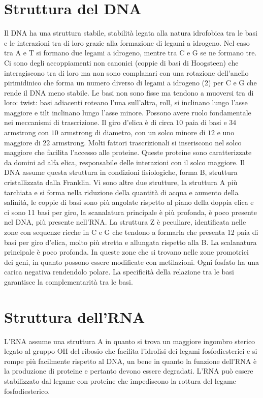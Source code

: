 \section{Struttura del DNA}
Il DNA ha una struttura stabile, stabilit\`a legata alla natura idrofobica tra le basi e le interazioni tra di loro grazie alla formazione di legami a idrogeno. Nel caso tra A e T si 
formano due legami a idrogeno, mentre tra C e G se ne formano tre. Ci sono degli accoppiamenti non canonici (coppie di basi di Hoogsteen) che interagiscono tra di loro ma non sono 
complanari con una rotazione dell'anello pirimidinico che forma un numero diverso di legami a idrogeno (2) per C e G che rende il DNA meno stabile. Le basi non sono fisse ma tendono a 
muoversi tra di loro: twist: basi adiacenti roteano l'una sull'altra, roll, si inclinano lungo l'asse maggiore e tilt inclinano lungo l'asse minore. Possono avere ruolo fondamentale nei
meccanismi di trascrizione.  Il giro d'elica \`e di circa $10$ paia di basi e $34$ armstrong con $10$ armstrong di diametro, con un solco minore di $12$ e uno maggiore di $22$ armstrong. 
Molti fattori trascrizionali si inseriscono nel solco maggiore che facilita l'accesso alle proteine. Queste proteine sono caratterizzate da domini ad alfa elica, responsabile delle 
interazioni con il solco maggiore. Il DNA assume questa struttura in condizioni fisiologiche, forma B, struttura cristallizzata dalla Franklin. Vi sono altre due strutture, la struttura A
pi\`u tarchiata e si forma nella riduzione della quantit\`a di acqua e aumento della salinit\`a, le coppie di basi sono pi\`u angolate rispetto al piano della doppia elica e ci sono 11
basi per giro, la scanalatura principale \`e pi\`u profonda, \`e poco presente nel DNA, pi\`u presente nell'RNA. La struttura Z \`e peculiare, identificata nelle zone con sequenze ricche 
in C e G che tendono a formarla che presenta 12 paia di basi per giro d'elica, molto pi\`u stretta e allungata rispetto alla B. La scalanatura principale \`e poco profonda. In queste zone
che si trovano nelle zone promotrici dei geni, in quanto possono essere modificate con metilazioni. Ogni fosfato ha una carica negativa rendendolo polare. La specificit\`a della relazione
tra le basi garantisce la complementarit\`a tra le basi. 
\section{Struttura dell'RNA}
L'RNA assume una struttura A in quanto si trova un maggiore ingombro sterico legato al gruppo OH del ribosio che facilita l'idrolisi dei legami fosfodiesterici e si rompe pi\`u facilmente
rispetto al DNA, un bene in quanto la funzione dell'RNA \`e la produzione di proteine e pertanto devono essere degradati. L'RNA pu\`o essere stabilizzato dal legame con proteine che 
impediscono la rottura del legame fosfodiesterico. 
